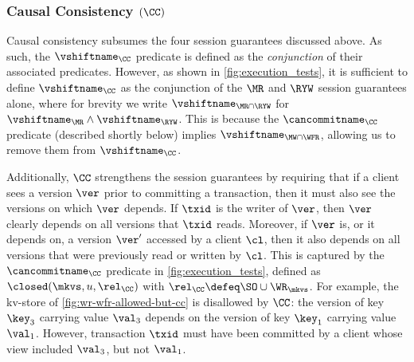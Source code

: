 
\subsubsection{Causal Consistency $(\CC)$}
Causal consistency subsumes the  four session guarantees discussed above. 
As such, the $\vshiftname_\CC$ predicate is defined as the \emph{conjunction} of their associated \vshiftname predicates.
However, as shown in  \cref{fig:execution_tests}, it is sufficient to define $\vshiftname_\CC$
as the conjunction of the $\MR$ and $\RYW$ session guarantees alone, where for brevity we 
write $\vshiftname_{\MR \cap \RYW}$ for  $\vshiftname_{\MR} \land \vshiftname_{\RYW}$.
This is because 
the $\cancommitname_{\CC}$ predicate (described shortly below) implies $\vshiftname_{\MW \cap \WFR}$, allowing us to remove them from $\vshiftname_{\CC}$.

Additionally, $\CC$ strengthens the session guarantees by requiring that if a client sees a version $\ver$ prior to committing a transaction, then it must also see the versions 
on which $\ver$ depends.
If $\txid$ is the writer of $\ver$, then 
$\ver$ clearly depends on all versions that $\txid$ reads. 
Moreover, if $\ver$ is, or it depends on, a version $\ver'$ accessed by 
a client $\cl$, then it also depends on all versions that were previously 
read or written by $\cl$. 
This is captured by the $\cancommitname_{\CC}$ predicate in \cref{fig:execution_tests}, 
defined as $\closed(\mkvs, u, \rel_{\CC})$ with $\rel_\CC \defeq \SO \cup \WR_{\mkvs}$.
For example, the kv-store of 
\cref{fig:wr-wfr-allowed-but-cc} 
is disallowed by $\CC$: the version of key $\key_3$ carrying value $\val_3$ depends on the version of key $\key_1$ carrying value $\val_1$. However, transaction $\txid$ must have been committed by a client whose view included $\val_3$, but not $\val_1$.

